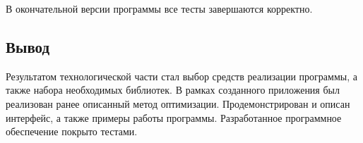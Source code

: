 В окончательной версии программы все тесты завершаются корректно.

\subsection*{Вывод}
Результатом технологической части стал выбор средств реализации программы, а также набора необходимых библиотек. В рамках созданного приложения был реализован ранее описанный метод оптимизации. Продемонстрирован и описан интерфейс, а также примеры работы программы. Разработанное программное обеспечение покрыто тестами.

\pagebreak
